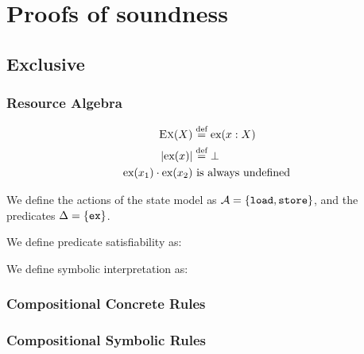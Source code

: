 \chapter{Proofs of soundness}

\section{Exclusive}

\subsection{Resource Algebra}

\begin{align*}
 	\Ex(X) &\defeq	\ex{x: X}\\
 	|\ex{x}| &\defeq \bot\\
 	\ex{x_1} \cdot \ex{x_2}&~\text{is always undefined}
 \end{align*}
 
We define the actions of the state model as $\actions=\{\load, \store\}$, and the predicates $\Delta=\{\exP\}$.
  
We define predicate satisfiability as:
\begin{mathpar}
\end{mathpar}

We define symbolic interpretation as:

\subsection{Compositional Concrete Rules}


\subsection{Compositional Symbolic Rules}


